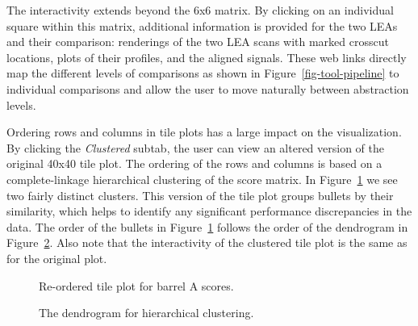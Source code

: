 \documentclass[
  12pt]{article}
\begin{document}
The interactivity extends beyond the 6x6 matrix. By clicking on an
individual square within this matrix, additional information is provided
for the two LEAs and their comparison: renderings of the two LEA scans
with marked crosscut locations, plots of their profiles, and the aligned
signals. These web links directly map the different levels of
comparisons as shown in Figure~\ref{fig-tool-pipeline} to individual
comparisons and allow the user to move naturally between abstraction
levels.

Ordering rows and columns in tile plots has a large impact on the
visualization. By clicking the \emph{Clustered} subtab, the user can
view an altered version of the original 40x40 tile plot. The ordering of
the rows and columns is based on a complete-linkage hierarchical
clustering of the score matrix. In Figure~\ref{fig-ClusteredMatrix} we
see two fairly distinct clusters. This version of the tile plot groups
bullets by their similarity, which helps to identify any significant
performance discrepancies in the data. The order of the bullets in
Figure~\ref{fig-ClusteredMatrix} follows the order of the dendrogram in
Figure~\ref{fig-dendrogram}. Also note that the interactivity of the
clustered tile plot is the same as for the original plot.

\begin{figure}


\caption{\label{fig-ClusteredMatrix}Re-ordered tile plot for barrel A
scores.}

\end{figure}%

\begin{figure}


\caption{\label{fig-dendrogram}The dendrogram for hierarchical
clustering.}

\end{figure}%
\end{document}
